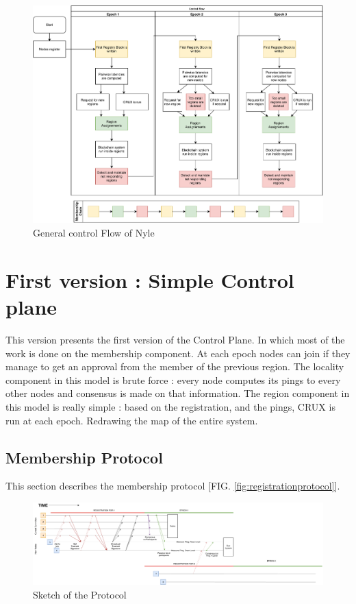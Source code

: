 \documentclass[a4paper,11pt,oneside]{report}
\begin{document}
\begin{figure}[!h] 
\centering
\includegraphics[width=400pt]{figures/Nyle_controlflow}
\caption{General control Flow of Nyle}
\label{fig:controlflow}
\end{figure}

\section{First version : Simple Control plane} This version presents the first
version of the Control Plane. In which most of the work is done on the
membership component. At each epoch nodes can join if they manage to get an
approval from the member of the previous region. The locality component in this
model is brute force : every node computes its pings to every other nodes and
consensus is made on that information. The region component in this model is
really simple : based on the registration, and the pings, CRUX is run at each
epoch. Redrawing the map of the entire system. 

\subsection{Membership Protocol}
This section describes the membership protocol [FIG. \autoref{fig:registrationprotocol}].


\begin{figure}
\centering
\includegraphics[width=700pt]{figures/Registrationprotocol}
\caption{Sketch of the Protocol}
\label{fig:registrationprotocol}
\end{figure}
\end{document}
